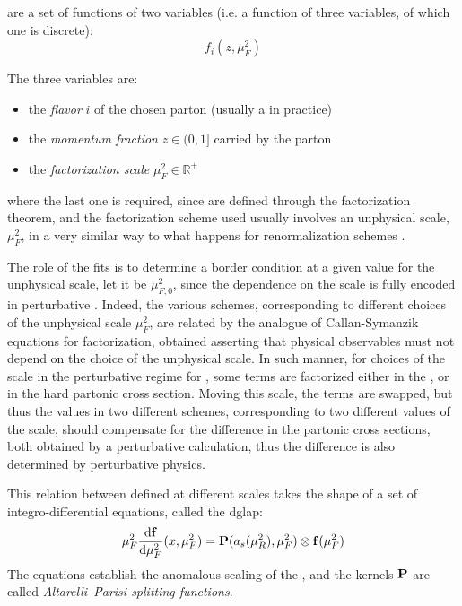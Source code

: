 
\pdfs are a set of functions of two variables (i.e. a function of three
variables, of which one is discrete):
\begin{equation}
  f_i(z, \mu_F^2)
\end{equation}

The three variables are:
\begin{itemize}
  \item the \textit{flavor} $i$ of the chosen parton (usually a \pid in practice)
  \item the \textit{momentum fraction} $z \in (0,1]$ carried by the parton
  \item the \textit{factorization scale} $\mu_F^2 \in \mathbb{R}^+$
\end{itemize}
where the last one is required, since \pdfs are defined through the
factorization theorem, and the factorization scheme used usually involves an
unphysical scale, $\mu_F^2$, in a very similar way to what happens for
renormalization schemes \cite{Ellis:1996mzs}.

The role of the \pdf fits is to determine a border condition at a given value
for the unphysical scale, let it be $\mu_{F,0}^2$, since the dependence on the
scale is fully encoded in perturbative \qcd.
%
Indeed, the various schemes, corresponding to different choices of the
unphysical scale $\mu_F^2$, are related by the analogue of Callan-Symanzik
equations for factorization, obtained asserting that physical observables must
not depend on the choice of the unphysical scale.
%
In such manner, for choices of the scale in the perturbative regime for \qcd,
some terms are factorized either in the \pdf, or in the hard partonic cross
section.
Moving this scale, the terms are swapped, but thus the \pdf values in two
different schemes, corresponding to two different values of the scale, should
compensate for the difference in the partonic cross sections, both obtained by
a perturbative calculation, thus the difference is also determined by
perturbative physics.

This relation between \pdfs defined at different scales takes the shape of a
set of integro-differential equations, called the \acrfull{dglap}:
\begin{equation}
	\muF^2 \dv{\vb f}{\muF^2}{}(x,\muF^2) = \vb P (a_s(\muR^2),\muF^2) \otimes \vb f(\muF^2)
	\label{eq:qcd/dglap}
\end{equation}
The equations establish the anomalous scaling of the \pdfs, and the kernels
${\vb P}$ are called \textit{Altarelli--Parisi splitting functions}.

